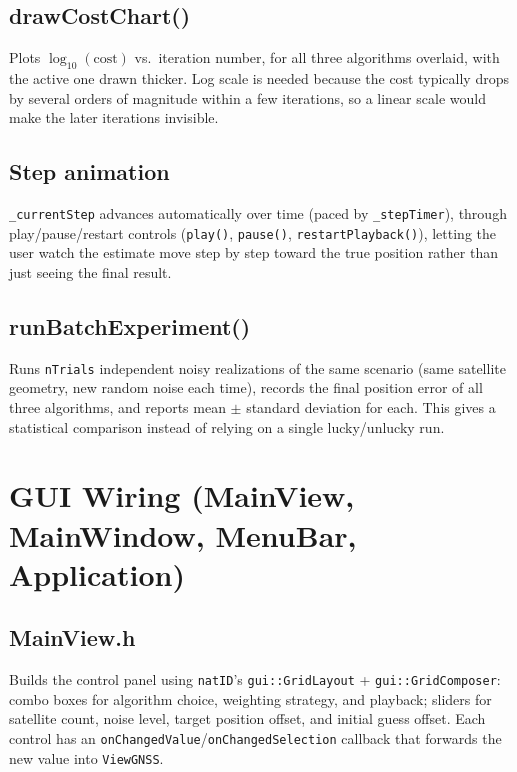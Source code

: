 \documentclass[11pt]{article}
\begin{document}
\subsection{drawCostChart()}

Plots $\log_{10}(\text{cost})$ vs.\ iteration number, for all three algorithms overlaid, with the active one drawn thicker. Log scale is needed because the cost typically drops by several orders of magnitude within a few iterations, so a linear scale would make the later iterations invisible.

\subsection{Step animation}

\texttt{\_currentStep} advances automatically over time (paced by \texttt{\_stepTimer}), through play/pause/restart controls (\texttt{play()}, \texttt{pause()}, \texttt{restartPlayback()}), letting the user watch the estimate move step by step toward the true position rather than just seeing the final result.

\subsection{runBatchExperiment()}

Runs \texttt{nTrials} independent noisy realizations of the same scenario (same satellite geometry, new random noise each time), records the final position error of all three algorithms, and reports mean $\pm$ standard deviation for each. This gives a statistical comparison instead of relying on a single lucky/unlucky run.

\section{GUI Wiring (MainView, MainWindow, MenuBar, Application)}

\subsection{MainView.h}

Builds the control panel using \texttt{natID}'s \texttt{gui::GridLayout} + \texttt{gui::GridComposer}: combo boxes for algorithm choice, weighting strategy, and playback; sliders for satellite count, noise level, target position offset, and initial guess offset. Each control has an \texttt{onChangedValue}/\texttt{onChangedSelection} callback that forwards the new value into \texttt{ViewGNSS}. 
\end{document}
